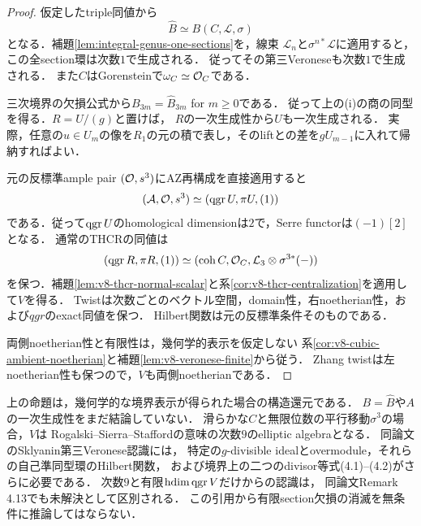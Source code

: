 \documentclass[11pt,a4paper]{ltjsarticle}
\begin{document}
\begin{proof}
仮定したtriple同値から
\[
 \widehat B\simeq B(C,\mathcal L,\sigma)
\]
となる．補題\ref{lem:integral-genus-one-sections}を，線束
$\mathcal L_n$と$\sigma^{n*}\mathcal L$に適用すると，この全section環は次数$1$で生成される．
従ってその第三Veroneseも次数$1$で生成される．
また$C$はGorensteinで$\omega_C\simeq\mathcal O_C$である．

三次境界の欠損公式から$B_{3m}=\widehat B_{3m}$ for $m\geq0$である．
従って上の(i)の商の同型を得る．$R=U/(g)$と置けば，
$R$の一次生成性から$U$も一次生成される．
実際，任意の$u\in U_m$の像を$R_1$の元の積で表し，そのliftとの差を$gU_{m-1}$に入れて帰納すればよい．

元の反標準ample pair $(\mathcal O,s^3)$にAZ再構成を直接適用すると
\[
 (\mathcal A,\mathcal O,s^3)\simeq(\operatorname{qgr} U,\pi U,(1))
\]
である．従って$\operatorname{qgr} U$のhomological dimensionは$2$で，Serre functorは$(-1)[2]$となる．
通常のTHCRの同値は
\[
 (\operatorname{qgr} R,\pi R,(1))\simeq
 (\operatorname{coh} C,\mathcal O_C,\mathcal L_3\otimes\sigma^{3*}(-))
\]
を保つ．補題\ref{lem:v8-thcr-normal-scalar}と系\ref{cor:v8-thcr-centralization}を適用して$V$を得る．
Twistは次数ごとのベクトル空間，domain性，右noetherian性，および$qgr$のexact同値を保つ．
Hilbert関数は元の反標準条件そのものである．

両側noetherian性と有限性は，幾何学的表示を仮定しない
系\ref{cor:v8-cubic-ambient-noetherian}と補題\ref{lem:v8-veronese-finite}から従う．
Zhang twistは左noetherian性も保つので，$V$も両側noetherianである．
\end{proof}

\begin{remark}[中心化で消えない問題]
上の命題は，幾何学的な境界表示が得られた場合の構造還元である．
$B=\widehat B$や$A$の一次生成性をまだ結論していない．
滑らかな$C$と無限位数の平行移動$\sigma^3$の場合，$V$は
Rogalski--Sierra--Staffordの意味の次数$9$のelliptic algebraとなる．
同論文\cite[Notation 3.2, Theorem 4.3]{RSS}のSklyanin第三Veronese認識には，
特定の$g$-divisible idealとovermodule，それらの自己準同型環のHilbert関数，
および境界上の二つのdivisor等式(4.1)--(4.2)がさらに必要である．
次数$9$と有限$\operatorname{hdim}\operatorname{qgr} V$だけからの認識は，
同論文Remark 4.13でも未解決として区別される．
この引用から有限section欠損の消滅を無条件に推論してはならない．

\end{remark}
\end{document}
